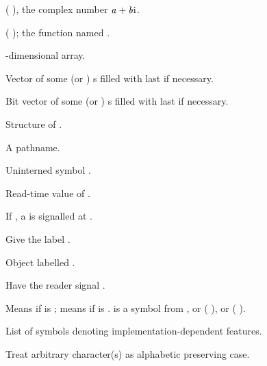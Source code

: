 \begin{LIST}{1cm}
  {
    (  ), the complex number
    $\VAR{a}+\VAR{b}\text{i}$.
  }

  {
    ( ); the function named .
  }

  {%
  -dimensional array.
  }

  {\index{\#(}%
    Vector of some (or )
    s filled with last  if necessary.
  }

  {%
    Bit vector of some (or )
    s filled with last  if necessary.
  }

  {
    Structure of .
  }

  {
    A pathname.
  }

  {
    Uninterned symbol .
  }

  {
    Read-time value of .
  }

  {
    If \NIL, a  is signalled at .
  }

  {\index{\#=}%
    Give  the label .
  }

  {\index{\#\#}%
    Object labelled .
  }

  \IT{\KWD{\#\boldmath$<$}\qquad\qquad\qquad}
  {%
    Have the reader signal .
  }

  {
    Means  if  is \T; means
     if  is \NIL.  is a
    symbol from , or (
    ), or ( ).
  }

  {
    List of symbols denoting implementation-dependent features.
  }

  {\index{\@{$\backslash$}}%
    Treat arbitrary character(s)  as alphabetic preserving case.
  }

\end{LIST}


